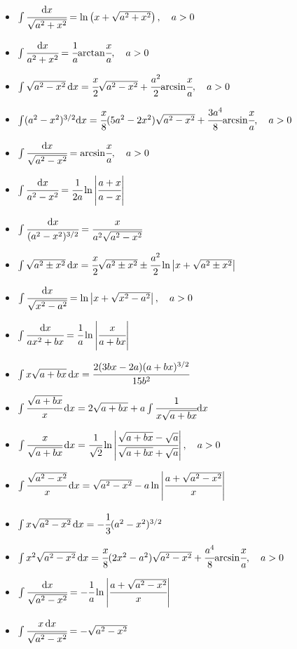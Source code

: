 \begin{itemize}
\item $ \int \cfrac{{ { \text{d} } x}}{\sqrt{a^2 + x^2}}= \ln \left(x + \sqrt{a^2 + x^2}\right),\quad a > 0 $
\item $ \int \cfrac{{ { \text{d} } x}}{a^2 + x^2}= \cfrac{1}{a} { \mathop{\text{arctan}} } \cfrac{x}{a} ,\quad a > 0 $
\item $ \int \sqrt{a^2 - x^2} \, { { \text{d} } x} = \cfrac{x}{2} \sqrt{a^2 - x^2} + \cfrac{a^2}{2} { \mathop{\text{arcsin}} } \cfrac{x}{a} ,\quad a > 0 $
\item $ \int (a^2 - x^2)^{3/2} { { \text{d} } x} = \cfrac{x}{8} (5a^2 - 2x^2)\sqrt{a^2 - x^2} + \cfrac{3a^4}{8} { \mathop{\text{arcsin}} } \cfrac{x}{a} ,\quad a > 0 $
\item $ \int \cfrac{{ { \text{d} } x}}{\sqrt{a^2 - x^2}} = { \mathop{\text{arcsin}} } \cfrac{x}{a} ,\quad a > 0 $
\item $ \int \cfrac{{ { \text{d} } x}}{a^2 - x^2} = \cfrac{1}{2a} \ln\left\vert \cfrac{a + x}{a - x}\right\vert $
\item $ \int \cfrac{{ { \text{d} } x}}{(a^2 - x^2)^{3/2}} = \cfrac{x}{a^2\sqrt{a^2 - x^2}} $
\item $ \int \sqrt{a^2 \pm x^2} \, { { \text{d} } x} = \cfrac{x}{2} \sqrt{a^2 \pm x^2} \pm \cfrac{a^2}{2} \ln\left\vert x + \sqrt{a^2 \pm x^2}\right\vert $
\item $ \int \cfrac{{ { \text{d} } x}}{\sqrt{x^2 - a^2}}= \ln\left\vert x + \sqrt{x^2 - a^2}\right\vert, \quad a > 0 $
\item $ \int \cfrac{{ { \text{d} } x}}{a x^2 + b x}= \cfrac{1}{a} \ln\left\vert\cfrac{x}{a + bx}\right\vert $
\item $ \int x \sqrt{a + b x} \, { { \text{d} } x}= \cfrac{2(3bx - 2a)(a + bx)^{3/2}}{15 b^2} $
\item $ \int \cfrac{\sqrt{a + b x}}{x} \, { { \text{d} } x}= 2\sqrt{a + b x} + a \int \cfrac{1}{x \sqrt{a + b x}} { { \text{d} } x} $
\item $ \int \cfrac{x}{\sqrt{a + b x}} \, { { \text{d} } x}= \cfrac{1}{\sqrt{2}} \ln\left\vert\cfrac{\sqrt{a + b x} - \sqrt{a}}{\sqrt{a + b x} + \sqrt{a}}\right\vert, \quad a > 0 $
\item $ \int \cfrac{\sqrt{a^2 - x^2}}{x} \, { { \text{d} } x} = \sqrt{a^2 - x^2} - a \ln\left\vert\cfrac{a + \sqrt{a^2 - x^2}}{x}\right\vert $
\item $ \int x \sqrt{a^2 - x^2} \, { { \text{d} } x} = - \cfrac{1}{3} (a^2 - x^2)^{3/2} $
\item $ \int x^2 \sqrt{a^2 - x^2} \, { { \text{d} } x} = \cfrac{x}{8} (2x^2 - a^2)\sqrt{a^2 - x^2} + \cfrac{a^4}{8} { \mathop{\text{arcsin}} } \cfrac{x}{a} , \quad a > 0 $
\item $ \int \cfrac{{ { \text{d} } x}}{\sqrt{a^2 - x^2}}= - \cfrac{1}{a} \ln\left\vert\cfrac{a + \sqrt{a^2 - x^2}}{x}\right\vert $
\item $ \int \cfrac{x \, { { \text{d} } x}}{\sqrt{a^2 - x^2}} = - \sqrt{a^2 - x^2} $

\end{itemize}
